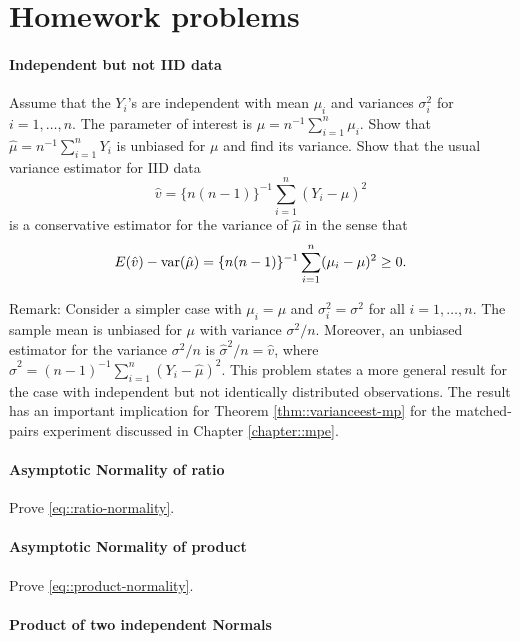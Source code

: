 \section{Homework problems}

\paragraph{Independent but not IID data}
\label{hw::inid}

Assume that the $Y_i$'s are independent with mean $\mu_i$ and variances $\sigma_i^2$ for $i=1,\ldots, n$. The parameter of interest is 
$
\mu = n^{-1} \sum_{i=1}^n \mu_i.
$
Show that 
$
\hat\mu = n^{-1} \sum_{i=1}^n Y_i
$
is unbiased for $\mu$ and find its variance. Show that the usual variance estimator for IID data
$$
\hat{v} = \{  n(n-1) \}^{-1} \sum_{i=1}^n (Y_i -  \hat{\mu})^2
$$
is a conservative estimator for the variance of $\hat\mu$ in the sense that
$$
E(\hat{v}) - \textup{var}( \hat\mu ) = \{  n(n-1) \}^{-1} \sum_{i=1}^n (\mu_i - \mu)^2 \geq 0. 
$$

Remark: Consider a simpler case with $\mu_i = \mu$ and $\sigma_i^2 = \sigma^2$ for all $i=1,\ldots, n$. The sample mean is unbiased for $\mu$ with variance $\sigma^2/n$. Moreover, an unbiased estimator for the variance $\sigma^2/n$ is $\hat \sigma^2/n = \hat v$, where $\hat\sigma^2 = (n-1)^{-1} \sum_{i=1}^n (Y_i -  \hat{\mu})^2$. 
This problem states a more general result for the case with independent but not identically distributed observations. The result has an important implication for Theorem \ref{thm::varianceest-mp} for the matched-pairs experiment discussed in Chapter \ref{chapter::mpe}. 





\paragraph{Asymptotic Normality of ratio}\label{hw::asymptotic-normality-ratio}


Prove \eqref{eq::ratio-normality}.


\paragraph{Asymptotic Normality of product}\label{hw::asymptotic-normality-product}


Prove \eqref{eq::product-normality}.


\paragraph{Product of two independent Normals}\label{hw-product-Normals}

